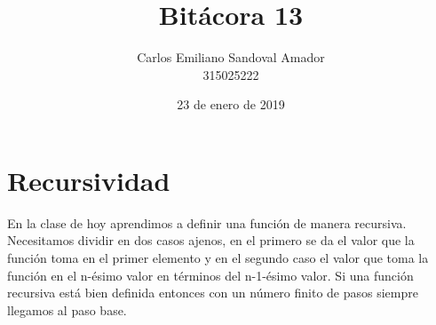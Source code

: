\documentclass[letterpaper, 12pt, oneside]{article}%
\title{Bitácora 13}
\author{Carlos Emiliano Sandoval Amador \\ 315025222}
\date{23 de enero de 2019}
\begin{document}
	\maketitle
	\section*{Recursividad}
	En la clase de hoy aprendimos a definir una función de manera recursiva. Necesitamos dividir en dos casos ajenos, en el primero se da el valor que la función toma en el primer elemento y en el segundo caso el valor que toma la función en el n-ésimo valor en términos del n-1-ésimo valor. Si una función recursiva está bien definida entonces con un número finito de pasos siempre llegamos al paso base.
\end{document}
